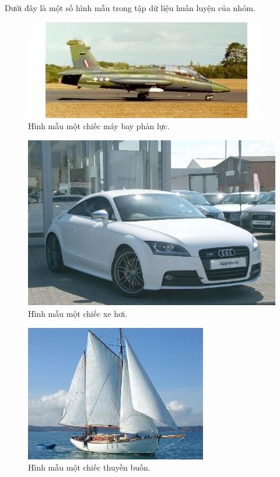 \documentclass[a4paper,14pt]{extreport}
\begin{document}
Dưới đây là một số hình mẫu trong tập dữ liệu huấn luyện của nhóm.
\begin{figure}
    \centering
    \includegraphics[scale=1]{img/airplane-sample.jpg}
    \caption{Hình mẫu một chiếc máy bay phản lực.}
    \label{fig:arplane-sample}
\end{figure}
\begin{figure}
    \centering
    \includegraphics[scale=0.5]{img/car-sample.jpg}
    \caption{Hình mẫu một chiếc xe hơi.}
    \label{fig:car-sample}
\end{figure}
\begin{figure}
    \centering
    \includegraphics[scale=1]{img/ketch-sample.jpg}
    \caption{Hình mẫu một chiếc thuyền buồn.}
    \label{fig:ketch-sample}
\end{figure}
\end{document}
